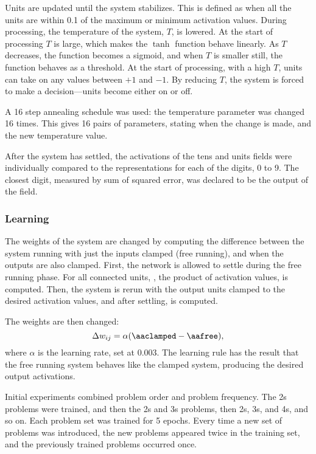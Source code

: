 Units are updated until the system stabilizes.  This is defined as when
all the units are within 0.1 of the maximum or minimum activation values.
During
processing, the temperature of the system, $T$, is lowered. At the start of
processing $T$ is large, which makes the $\tanh$ function behave linearly.
As $T$ decreases, the function becomes a sigmoid, and when $T$ is smaller
still, the function behaves as a threshold. At the start of processing,
with a high $T$, units can take on any values between $+1$ and $-1$. By
reducing
$T$, the system is forced to make a decision---units become either on or
off.

A 16 step annealing schedule was used: the temperature parameter
was changed 16 times.  This gives 16
pairs of parameters, stating when the change is
made, and the new temperature value.

After the system has settled, the activations of the tens and units fields
were individually
compared to the representations for each of the digits, 0
to 9.  The closest digit, measured by sum
of squared error, was declared to be the
output of the field.

\subsubsection{Learning}

The weights of the system are changed by computing the
difference between
the system running with just the inputs clamped (free running), and when
the outputs are also clamped.  First, the network is allowed to settle
during the free running phase.  For all connected units, \aafree, the
product of activation values, is computed.  Then, the system is rerun with
the output units clamped to the desired activation values,
and after settling, \aaclamped{} is
computed.

The weights are then changed:
$$ \Delta w_{ij} = \alpha ( \aaclamped - \aafree), $$
\noindent where $\alpha$
is the learning rate, set at 0.003. The learning rule has
the result that the free running system behaves like the clamped system,
producing the desired output activations.

Initial experiments combined problem order and problem frequency. The 2s
problems were trained, and then the 2s and 3s problems, then 2s, 3s, and
4s, and so on.  Each problem set was trained for 5 epochs. Every time a new
set of problems was introduced, the new problems appeared twice in the
training set, and the previously trained problems occurred once.


